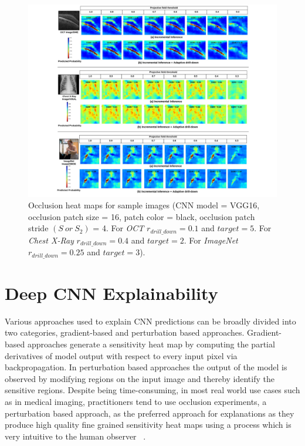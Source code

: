 \begin{figure}[t]
\includegraphics[width=\textwidth]{visualsjpeg}
\caption{Occlusion heat maps for sample images (CNN model = VGG16, occlusion patch size = 16, patch color = black, occlusion patch stride $(S~or~S_2)$ = 4. For \textit{OCT} $r_{drill\_down}=0.1$ and $\mathit{target}=5$. For \textit{Chest X-Ray} $r_{drill\_down}=0.4$ and $\mathit{target}=2$. For \textit{ImageNet} $r_{drill\_down}=0.25$ and $\mathit{target}=3$).}
\label{fig:visual_examples}
\end{figure}

\section{Deep CNN Explainability}
Various approaches used to explain CNN predictions can be broadly divided into two categories, gradient-based and perturbation based approaches. Gradient-based approaches generate a sensitivity heat map by computing the partial derivatives of model output with respect to every input pixel via backpropagation.
In perturbation based approaches the output of the model is observed by modifying regions on the input image and thereby identify the sensitive regions.
Despite being time-consuming, in most real world use cases such as in medical imaging, practitioners tend to use occlusion experiments, a perturbation based approach, as the preferred approach for explanations as they produce high quality fine grained sensitivity heat maps using a process which is very intuitive to the human observer ~\cite{zeiler2014visualizing,jung2017deep,miller2017explanation}.

